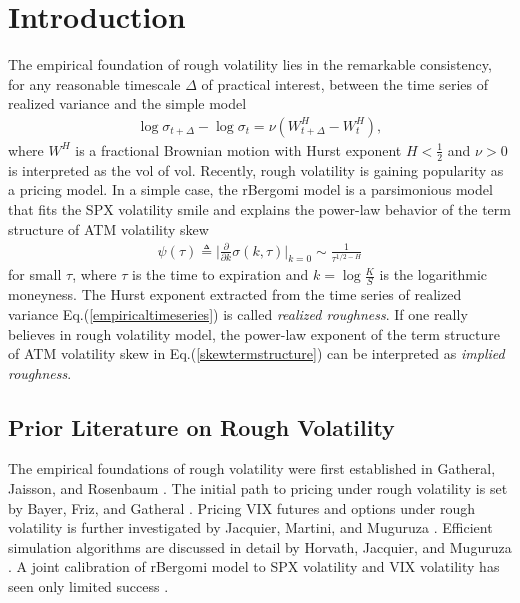 \documentclass[12pt]{article}
\numberwithin{equation}{section}
\begin{document}
\section{Introduction}
The empirical foundation of rough volatility lies in the remarkable consistency, for any reasonable timescale $\Delta$ of practical interest, between the time series of realized variance and the simple model \cite{gatheral1}
\begin{align}
\label{empiricaltimeseries}
\log \sigma_{t+\Delta} - \log\sigma_t = \nu (W_{t+\Delta}^H - W_t^H),
\end{align}
where $W^H$ is a fractional Brownian motion with Hurst exponent $H<\frac{1}{2}$ and $\nu>0$ is interpreted as the vol of vol. Recently, rough volatility is gaining popularity as a pricing model. In a simple case, the rBergomi model is a parsimonious model that fits the SPX volatility smile and explains the power-law behavior of the term structure of ATM volatility skew 
\begin{align}
\label{skewtermstructure}
\psi(\tau) \triangleq \Big| \frac{\partial}{\partial k}\sigma(k,\tau) \Big|_{k=0} \sim \frac{1}{\tau^{1/2-H}}
\end{align}
for small $\tau$, where $\tau$ is the time to expiration and $k=\log \frac{K}{S}$ is the logarithmic moneyness. The Hurst exponent extracted from the time series of realized variance Eq.(\ref{empiricaltimeseries}) is called \textit{realized roughness}. If one really believes in rough volatility model, the power-law exponent of the term structure of ATM volatility skew in Eq.(\ref{skewtermstructure}) can be interpreted as \textit{implied roughness}. 

\subsection{Prior Literature on Rough Volatility}
The empirical foundations of rough volatility were first established in Gatheral, Jaisson, and Rosenbaum \cite{gatheral1}. The initial path to pricing under rough volatility is set by Bayer, Friz, and Gatheral \cite{bayer}. Pricing VIX futures and options under rough volatility is further investigated by Jacquier, Martini, and Muguruza \cite{jacquier1}. Efficient simulation algorithms are discussed in detail by Horvath, Jacquier, and Muguruza \cite{horvath}. A joint calibration of rBergomi model to SPX volatility and VIX volatility has seen only limited success \cite{bayer}.
\end{document}
